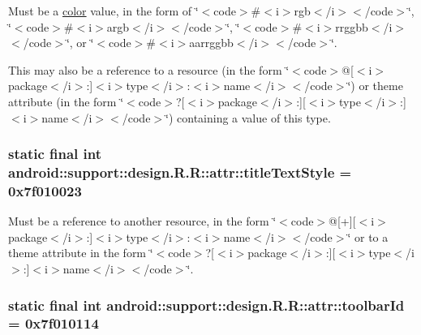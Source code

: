 Must be a \hyperlink{classandroid_1_1support_1_1design_1_1_r_1_1color}{color} value, in the form of \char`\"{}$<$code$>$\#$<$i$>$rgb$<$/i$>$$<$/code$>$\char`\"{}, \char`\"{}$<$code$>$\#$<$i$>$argb$<$/i$>$$<$/code$>$\char`\"{}, \char`\"{}$<$code$>$\#$<$i$>$rrggbb$<$/i$>$$<$/code$>$\char`\"{}, or \char`\"{}$<$code$>$\#$<$i$>$aarrggbb$<$/i$>$$<$/code$>$\char`\"{}. 

This may also be a reference to a resource (in the form \char`\"{}$<$code$>$@\mbox{[}$<$i$>$package$<$/i$>$:\mbox{]}$<$i$>$type$<$/i$>$:$<$i$>$name$<$/i$>$$<$/code$>$\char`\"{}) or theme attribute (in the form \char`\"{}$<$code$>$?\mbox{[}$<$i$>$package$<$/i$>$:\mbox{]}\mbox{[}$<$i$>$type$<$/i$>$:\mbox{]}$<$i$>$name$<$/i$>$$<$/code$>$\char`\"{}) containing a value of this type. \hypertarget{classandroid_1_1support_1_1design_1_1_r_1_1attr_117bc36ff5bc4fd7110fea94fc463ee0}{
\subsubsection[{titleTextStyle}]{\setlength{\rightskip}{0pt plus 5cm}static final int android::support::design.R.R::attr::titleTextStyle = 0x7f010023}}
\label{classandroid_1_1support_1_1design_1_1_r_1_1attr_117bc36ff5bc4fd7110fea94fc463ee0}


Must be a reference to another resource, in the form \char`\"{}$<$code$>$@\mbox{[}+\mbox{]}\mbox{[}$<$i$>$package$<$/i$>$:\mbox{]}$<$i$>$type$<$/i$>$:$<$i$>$name$<$/i$>$$<$/code$>$\char`\"{} or to a theme attribute in the form \char`\"{}$<$code$>$?\mbox{[}$<$i$>$package$<$/i$>$:\mbox{]}\mbox{[}$<$i$>$type$<$/i$>$:\mbox{]}$<$i$>$name$<$/i$>$$<$/code$>$\char`\"{}. \hypertarget{classandroid_1_1support_1_1design_1_1_r_1_1attr_0bf443d75ade7181a06555c7bc04f8b7}{
\subsubsection[{toolbarId}]{\setlength{\rightskip}{0pt plus 5cm}static final int android::support::design.R.R::attr::toolbarId = 0x7f010114}}
\label{classandroid_1_1support_1_1design_1_1_r_1_1attr_0bf443d75ade7181a06555c7bc04f8b7}


